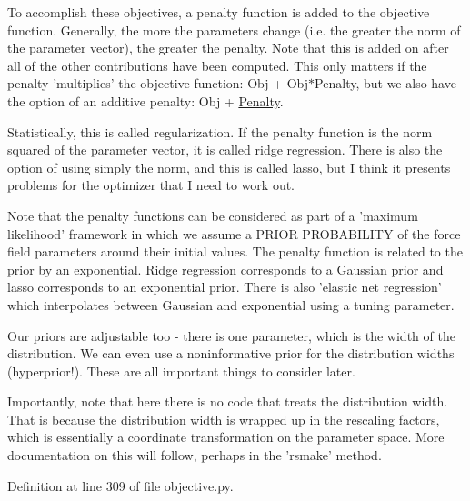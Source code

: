 \-To accomplish these objectives, a penalty function is added to the objective function. \-Generally, the more the parameters change (i.\-e. the greater the norm of the parameter vector), the greater the penalty. \-Note that this is added on after all of the other contributions have been computed. \-This only matters if the penalty 'multiplies' the objective function\-: \-Obj + \-Obj$\ast$\-Penalty, but we also have the option of an additive penalty\-: \-Obj + \hyperlink{classforcebalance_1_1objective_1_1Penalty}{\-Penalty}.

\-Statistically, this is called regularization. \-If the penalty function is the norm squared of the parameter vector, it is called ridge regression. \-There is also the option of using simply the norm, and this is called lasso, but \-I think it presents problems for the optimizer that \-I need to work out.

\-Note that the penalty functions can be considered as part of a 'maximum likelihood' framework in which we assume a \-P\-R\-I\-O\-R \-P\-R\-O\-B\-A\-B\-I\-L\-I\-T\-Y of the force field parameters around their initial values. \-The penalty function is related to the prior by an exponential. \-Ridge regression corresponds to a \-Gaussian prior and lasso corresponds to an exponential prior. \-There is also 'elastic net regression' which interpolates between \-Gaussian and exponential using a tuning parameter.

\-Our priors are adjustable too -\/ there is one parameter, which is the width of the distribution. \-We can even use a noninformative prior for the distribution widths (hyperprior!). \-These are all important things to consider later.

\-Importantly, note that here there is no code that treats the distribution width. \-That is because the distribution width is wrapped up in the rescaling factors, which is essentially a coordinate transformation on the parameter space. \-More documentation on this will follow, perhaps in the 'rsmake' method. 

\-Definition at line 309 of file objective.\-py.



